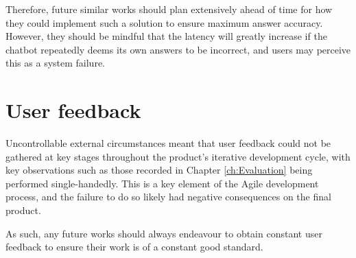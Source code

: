 \para Therefore, future similar works should plan extensively ahead of time for how they could implement such a solution to ensure maximum 
answer accuracy. However, they should be mindful that the latency will greatly increase if the chatbot repeatedly deems its own answers 
to be incorrect, and users may perceive this as a system failure.

\section{User feedback}
Uncontrollable external circumstances meant that user feedback could not be gathered at key stages throughout the product's iterative 
development cycle, with key observations such as those recorded in Chapter \ref{ch:Evaluation} being performed single-handedly.
This is a key element of the Agile development process, and the failure to do so likely had negative consequences on the final product.

\para As such, any future works should always endeavour to obtain constant user feedback to ensure their work is of a constant 
good standard.

